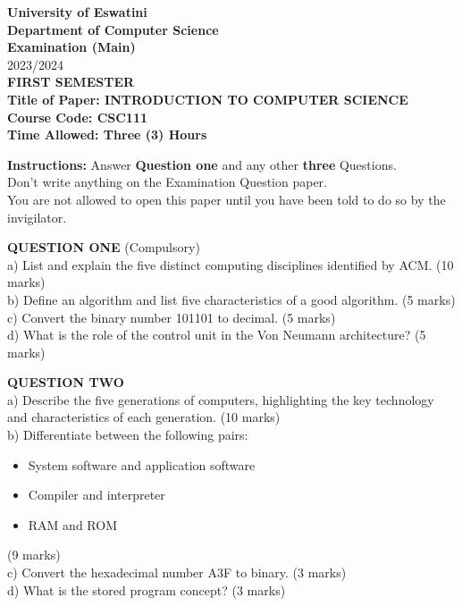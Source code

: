\documentclass[12pt]{article}
\begin{document}
\begin{center}
    \textbf{University of Eswatini} \\
    \textbf{Department of Computer Science} \\
    \textbf{Examination (Main)} \\
    2023/2024 \\
    \textbf{FIRST SEMESTER} \\
    \vspace{1cm}
    \textbf{Title of Paper: INTRODUCTION TO COMPUTER SCIENCE} \\
    \textbf{Course Code: CSC111} \\
    \vspace{1cm}
    \textbf{Time Allowed: Three (3) Hours}
\end{center}

\noindent
\textbf{Instructions:} Answer \textbf{Question one} and any other \textbf{three} Questions.\\
Don’t write anything on the Examination Question paper.\\
You are not allowed to open this paper until you have been told to do so by the invigilator.

\vspace{1cm}

\noindent
\textbf{QUESTION ONE} (Compulsory)\\
a) List and explain the five distinct computing disciplines identified by ACM. \hfill (10 marks)\\
b) Define an algorithm and list five characteristics of a good algorithm. \hfill (5 marks)\\
c) Convert the binary number 101101 to decimal. \hfill (5 marks)\\
d) What is the role of the control unit in the Von Neumann architecture? \hfill (5 marks)\\

\vspace{0.5cm}

\noindent
\textbf{QUESTION TWO}\\
a) Describe the five generations of computers, highlighting the key technology and characteristics of each generation. \hfill (10 marks)\\
b) Differentiate between the following pairs:
    \begin{itemize}
        \item System software and application software
        \item Compiler and interpreter
        \item RAM and ROM
    \end{itemize}
    \hfill (9 marks)\\
c) Convert the hexadecimal number A3F to binary. \hfill (3 marks)\\
d) What is the stored program concept? \hfill (3 marks)\\
\end{document}

